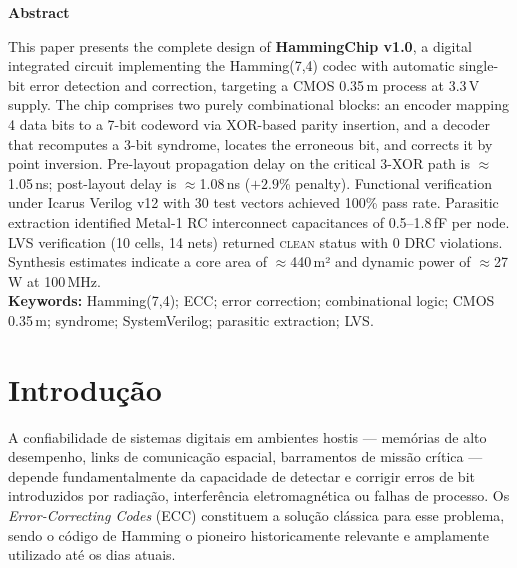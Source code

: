 \documentclass[12pt,a4paper]{article}
\begin{document}
\vspace{6pt}
\begin{center}
  {\large\bfseries\color{bwblack} Abstract}
\end{center}
\begin{unidadebox}[Abstract]
This paper presents the complete design of \textbf{HammingChip v1.0}, a digital integrated circuit implementing the Hamming(7,4) codec with automatic single-bit error detection and correction, targeting a CMOS 0.35\,\textmu m process at 3.3\,V supply. The chip comprises two purely combinational blocks: an encoder mapping 4 data bits to a 7-bit codeword via XOR-based parity insertion, and a decoder that recomputes a 3-bit syndrome, locates the erroneous bit, and corrects it by point inversion. Pre-layout propagation delay on the critical 3-XOR path is $\approx$1.05\,ns; post-layout delay is $\approx$1.08\,ns ($+2.9$\% penalty). Functional verification under Icarus Verilog v12 with 30 test vectors achieved 100\% pass rate. Parasitic extraction identified Metal-1 RC interconnect capacitances of 0.5--1.8\,fF per node. LVS verification (10 cells, 14 nets) returned \textsc{clean} status with 0 DRC violations. Synthesis estimates indicate a core area of $\approx$440\,\textmu m² and dynamic power of $\approx$27\,\textmu W at 100\,MHz.\\[4pt]
\textbf{Keywords:} Hamming(7,4); ECC; error correction; combinational logic; CMOS 0.35\,\textmu m; syndrome; SystemVerilog; parasitic extraction; LVS.
\end{unidadebox}

\newpage
\tableofcontents
\listoffigures
\listoftables
\newpage

\section{Introdução}

A confiabilidade de sistemas digitais em ambientes hostis --- memórias de alto desempenho, links de comunicação espacial, barramentos de missão crítica --- depende fundamentalmente da capacidade de detectar e corrigir erros de bit introduzidos por radiação, interferência eletromagnética ou falhas de processo. Os \textit{Error-Correcting Codes} (ECC) constituem a solução clássica para esse problema, sendo o código de Hamming o pioneiro historicamente relevante e amplamente utilizado até os dias atuais.
\end{document}
